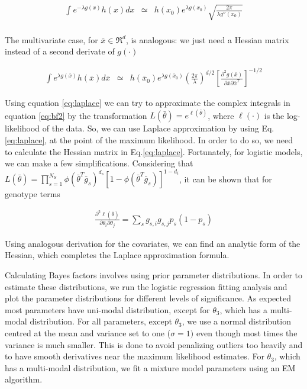 \begin{eqnarray*}
	\int{e^{-\lambda g(x)} h(x) dx} & \simeq & h(x_0) e^{\lambda g(x_0)} \sqrt{\frac{2 \pi}{\lambda g''(x_0)}} \\
\end{eqnarray*}

The multivariate case, for $\bar{x} \in \Re^d$, is analogous: we just need a Hessian matrix instead of a second derivate of $g(\cdot)$

\begin{eqnarray}\label{eq:laplace}
	\int{e^{\lambda g(\bar{x})} h(\bar{x}) d\bar{x}} & \simeq & h(\bar{x}_0) e^{\lambda g(\bar{x}_0)} 
	\left( \frac{2 \pi}{\lambda} \right)^{d/2} \left[ \frac{\partial^2 g(\bar{x}) }{\partial \bar{x} \partial \bar{x}^T} \right] ^{-1/2}
\end{eqnarray}

Using equation \ref{eq:laplace} we can try to approximate the complex integrals in equation \ref{eq:bf2} by the transformation $L(\bar{\theta}) = e^{\ell(\bar{\theta})}$, where $\ell(\cdot)$ is the log-likelihood of the data. So, we can use Laplace approximation by using Eq.\ref{eq:laplace}, at the point of the maximum likelihood. In order to do so, we need to calculate the Hessian matrix in Eq.\ref{eq:laplace}. Fortunately, for logistic models, we can make a few simplifications. Considering that $L(\bar{\theta}) = \prod_{s=1}^{N_S}{ \phi( \bar{\theta}^T \bar{g}_s)^{d_s} [ 1-\phi( \bar{\theta}^T \bar{g}_s) ]^{1-d_i} }$, it can be shown that for genotype terms

\begin{eqnarray*}
	\frac{ \partial^2 \ell(\bar{\theta}) }{ \partial\theta_i \partial\theta_j } 
	= \sum_s{ g_{s,i} g_{s,j} p_s (1-p_s) } 
\end{eqnarray*}

Using analogous derivation for the covariates, we can find an analytic form of the Hessian, which completes the Laplace approximation formula.

Calculating Bayes factors involves using prior parameter distributions. In order to estimate these distributions, we run the logistic regression fitting analysis and plot the parameter distributions for different levels of significance. As expected most parameters have uni-modal distribution, except for $\theta_3$, which has a multi-modal distribution. For all parameters, except $\theta_3$, we use a normal distribution centred at the mean and variance set to one ($\sigma=1)$ even though most times the variance is much smaller. This is done to avoid penalizing outliers too heavily and to have smooth derivatives near the maximum likelihood estimates. For $\theta_3$, which has a multi-modal distribution, we fit a mixture model parameters using an EM algorithm.

